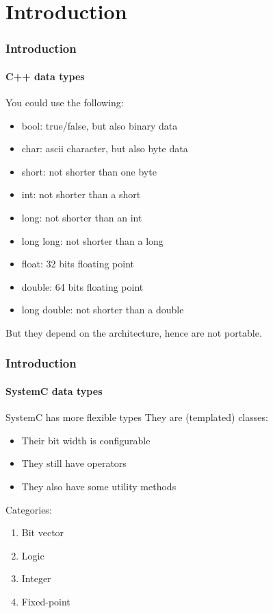 \section{Introduction}

\begin{frame}
\frametitle{Introduction}
\framesubtitle{C++ data types}

\begin{block}{You could use the following:}
\begin{itemize}
\item bool: true/false, but also binary data
\item char: ascii character, but also byte data
\item short: not shorter than one byte
\item int: not shorter than a short
\item long: not shorter than an int
\item long long: not shorter than a long
\item float: 32 bits floating point
\item double: 64 bits floating point
\item long double: not shorter than a double
\end{itemize}
But they depend on the architecture, hence are not portable.
\end{block}
\end{frame}

\begin{frame}
\frametitle{Introduction}
\framesubtitle{SystemC data types}

\begin{block}{SystemC has more flexible types}
They are (templated) classes:
\begin{itemize}
\item Their bit width is configurable
\item They still have operators
\item They also have some utility methods
\end{itemize}
\end{block}
\pause
\begin{block}{Categories:}
\begin{enumerate}
\item Bit vector
\item Logic
\item Integer
\item Fixed-point
\end{enumerate}
\end{block}

\end{frame}

